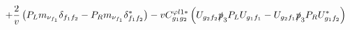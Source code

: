 %
\begin{dmath*}
%
  +  \frac{2}{v} \left(P_L m_{\nu_{f_1}} \delta_{f_1 f_2} - P_R m_{\nu_{f_1}} \delta_{f_1 f_2}^*\right)  -  vC^{ \varphi  l1*}_{g_1 g_2} \left(U_{g_2 f_2} \slashed{p}_{3} P_L U_{g_1 f_1} - U_{g_2 f_1} \slashed{p}_{3} P_R U_{g_1 f_2}^*\right)
%
\end{dmath*}
%
